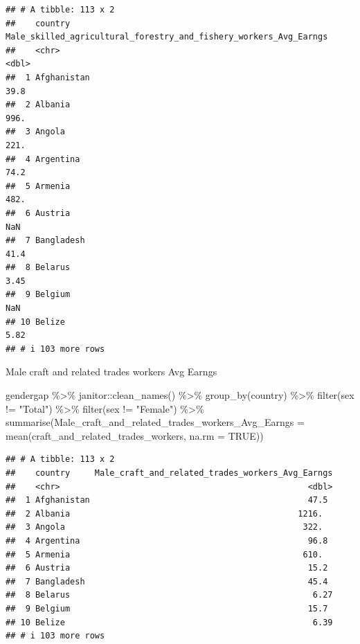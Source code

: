 \documentclass[
]{article}
\newenvironment{Shaded}{\begin{snugshade}}{\end{snugshade}}
\newcommand{\AttributeTok}[1]{\textcolor[rgb]{0.77,0.63,0.00}{#1}}
\newcommand{\ConstantTok}[1]{\textcolor[rgb]{0.00,0.00,0.00}{#1}}
\newcommand{\FunctionTok}[1]{\textcolor[rgb]{0.00,0.00,0.00}{#1}}
\newcommand{\NormalTok}[1]{#1}
\newcommand{\SpecialCharTok}[1]{\textcolor[rgb]{0.00,0.00,0.00}{#1}}
\newcommand{\StringTok}[1]{\textcolor[rgb]{0.31,0.60,0.02}{#1}}
\begin{document}
\begin{verbatim}
## # A tibble: 113 x 2
##    country     Male_skilled_agricultural_forestry_and_fishery_workers_Avg_Earngs
##    <chr>                                                                   <dbl>
##  1 Afghanistan                                                             39.8 
##  2 Albania                                                                996.  
##  3 Angola                                                                 221.  
##  4 Argentina                                                               74.2 
##  5 Armenia                                                                482.  
##  6 Austria                                                                NaN   
##  7 Bangladesh                                                              41.4 
##  8 Belarus                                                                  3.45
##  9 Belgium                                                                NaN   
## 10 Belize                                                                   5.82
## # i 103 more rows
\end{verbatim}

Male craft and related trades workers Avg Earngs

\begin{Shaded}
\begin{Highlighting}[]
\NormalTok{gendergap }\SpecialCharTok{\%\textgreater{}\%}
\NormalTok{  janitor}\SpecialCharTok{::}\FunctionTok{clean\_names}\NormalTok{() }\SpecialCharTok{\%\textgreater{}\%}
  \FunctionTok{group\_by}\NormalTok{(country) }\SpecialCharTok{\%\textgreater{}\%} 
   \FunctionTok{filter}\NormalTok{(sex }\SpecialCharTok{!=} \StringTok{"Total"}\NormalTok{) }\SpecialCharTok{\%\textgreater{}\%}
  \FunctionTok{filter}\NormalTok{(sex }\SpecialCharTok{!=} \StringTok{"Female"}\NormalTok{) }\SpecialCharTok{\%\textgreater{}\%}
  \FunctionTok{summarise}\NormalTok{(}\AttributeTok{Male\_craft\_and\_related\_trades\_workers\_Avg\_Earngs =} \FunctionTok{mean}\NormalTok{(craft\_and\_related\_trades\_workers, }\AttributeTok{na.rm =} \ConstantTok{TRUE}\NormalTok{))}
\end{Highlighting}
\end{Shaded}

\begin{verbatim}
## # A tibble: 113 x 2
##    country     Male_craft_and_related_trades_workers_Avg_Earngs
##    <chr>                                                  <dbl>
##  1 Afghanistan                                            47.5 
##  2 Albania                                              1216.  
##  3 Angola                                                322.  
##  4 Argentina                                              96.8 
##  5 Armenia                                               610.  
##  6 Austria                                                15.2 
##  7 Bangladesh                                             45.4 
##  8 Belarus                                                 6.27
##  9 Belgium                                                15.7 
## 10 Belize                                                  6.39
## # i 103 more rows
\end{verbatim}
\end{document}

